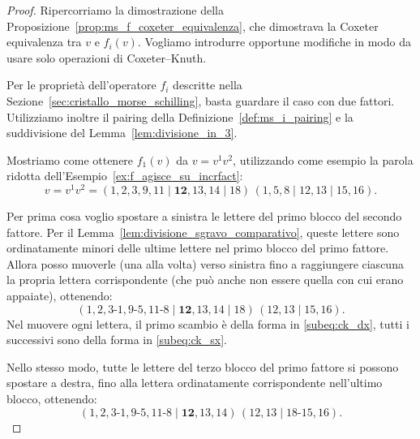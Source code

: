 \begin{proof}
    Ripercorriamo la dimostrazione della
    Proposizione~\ref{prop:ms_f_coxeter_equivalenza}, che dimostrava la
    Coxeter equivalenza tra $v$ e $f_i(v)$.
    Vogliamo introdurre opportune modifiche in modo da usare solo operazioni di Coxeter--Knuth.

    Per le propriet\`a dell'operatore $f_i$ descritte nella
    Sezione~\ref{sec:cristallo_morse_schilling}, basta guardare il caso con due fattori.
    Utilizziamo inoltre il pairing della Definizione~\ref{def:ms_i_pairing} e la suddivisione
    del Lemma~\ref{lem:divisione_in_3}.
    
    Mostriamo come ottenere $f_1(v)$ da $v = v^1v^2$, utilizzando come esempio la parola
    ridotta dell'Esempio~\ref{ex:f_agisce_su_incrfact}:
    \[
        v = v^1  v^2 = 
        ( 1, 2, 3, 9, 11 \mid \mathbf{12}, 13, 14 \mid 18 ) \,
        ( 1, 5, 8 \mid 12, 13 \mid 15, 16).
    \]

    
    Per prima cosa voglio spostare a sinistra le lettere del primo blocco del
    secondo fattore.
    Per il Lemma~\ref{lem:divisione_sgravo_comparativo}, queste lettere
    sono ordinatamente minori delle ultime lettere nel primo blocco del primo
    fattore.
    Allora posso muoverle (una alla volta) verso sinistra fino a raggiungere
    ciascuna la propria lettera corrispondente (che pu\`o anche non essere quella
    con cui erano appaiate), ottenendo:
    \[
        ( 1, 2 , 3\text{-} 1, 9 \text{-} 5,
        11 \text{-} 8\mid \mathbf{12}, 13, 14 \mid 18 ) \,
        ( 12, 13 \mid 15, 16).
    \]
    Nel muovere ogni lettera, il primo scambio \`e  della forma in
    \eqref{subeq:ck_dx}, tutti i successivi sono della forma in 
    \eqref{subeq:ck_sx}.

    Nello stesso modo, tutte le lettere del terzo blocco del primo fattore si
    possono spostare a destra, fino alla lettera ordinatamente corrispondente 
    nell'ultimo blocco, ottenendo:
    \[
        ( 1, 2 , 3\text{-} 1, 9 \text{-} 5,
        11 \text{-} 8\mid \mathbf{12}, 13, 14  ) \,
        ( 12, 13 \mid 18 \text{-}15,  16).
    \]


\end{proof}
